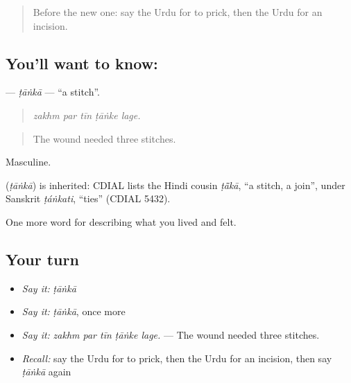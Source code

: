 \label{lesson:UR-C478-tanka}



\begin{quote}
Before the new one: say the Urdu for to prick, then the Urdu for an incision.
\end{quote}

\subsection*{You'll want to know: }
\textbf{} — \emph{ṭāṅkā} — \textquotedblleft{}a stitch\textquotedblright{}.

\begin{quote}
    
\end{quote}

\begin{quote}
\emph{zakhm par tīn ṭāṅke lage.}
\end{quote}

\begin{quote}
The wound needed three stitches.
\end{quote}

Masculine.

\begin{cousinweb}
\textbf{} (\emph{ṭāṅkā}) is inherited: CDIAL lists the Hindi cousin \emph{ṭā̃kā}, \textquotedblleft{}a stitch, a join\textquotedblright{}, under Sanskrit \emph{ṭáṅkati}, \textquotedblleft{}ties\textquotedblright{} (CDIAL 5432).
\end{cousinweb}

\begin{grammarlens}[title={What you've built}]
One more word for describing what you lived and felt.
\end{grammarlens}

\subsection*{Your turn}
\begin{itemize}
\raggedright
  \item \emph{Say it:} \emph{ṭāṅkā}
  \item \emph{Say it:} \emph{ṭāṅkā}, once more
  \item \emph{Say it:} \emph{zakhm par tīn ṭāṅke lage.} — The wound needed three stitches.
  \item \emph{Recall:} say the Urdu for to prick, then the Urdu for an incision, then say \emph{ṭāṅkā} again
\end{itemize}

